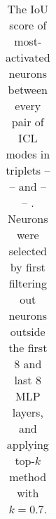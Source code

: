 \begin{table}[!htbp]
\begin{tabular}{lccc}
\midrule
\bottomrule
\end{tabular}
    \caption{The IoU score of most-activated neurons between every pair of ICL modes in triplets \english -- \multilingual -- \native and \english -- \chinese -- \native. Neurons were selected by first filtering out neurons outside the first 8 and last 8 MLP layers, and applying top-$k$ method with $k = 0.7$.}
    \vspace{-.2cm}
    \label{tab:neuron_statistics}
\end{table}
